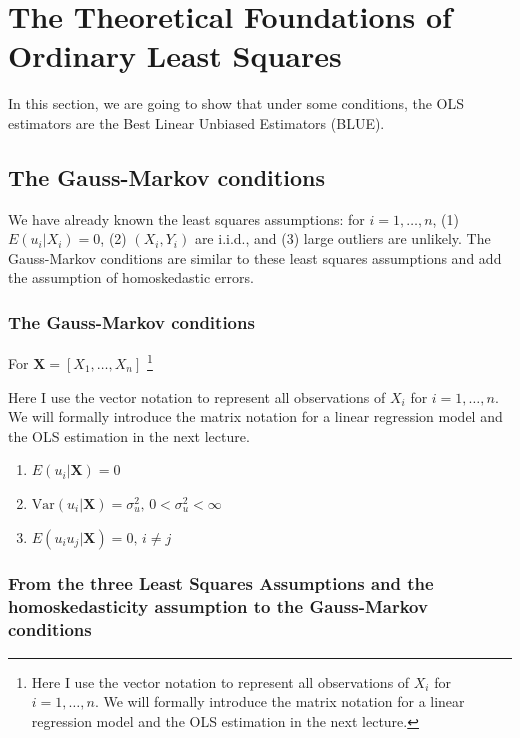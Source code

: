 \documentclass[a4paper,11pt]{article}
\newcommand{\var}{\mathrm{Var}}
\begin{document}
\section{The Theoretical Foundations of Ordinary Least Squares}
\label{sec:org07431ad}

In this section, we are going to show that under some conditions, the
OLS estimators are the Best Linear Unbiased Estimators (BLUE).

\subsection{The Gauss-Markov conditions}
\label{sec:org4949289}

We have already known the least squares assumptions: for \(i = 1,
\ldots, n\), (1) \(E(u_i|X_i) = 0\), (2) \((X_i, Y_i)\) are i.i.d., and (3)
large outliers are unlikely. The Gauss-Markov conditions are similar
to these least squares assumptions and add the assumption of
homoskedastic errors.

\subsubsection*{The Gauss-Markov conditions}
\label{sec:org2a74999}
For \(\mathbf{X} = [X_1, \ldots, X_n]\) \footnote{Here I use the vector
notation to represent all observations of \(X_i\) for \(i=1, \ldots,
n\). We will formally introduce the matrix notation for a linear
regression model and the OLS estimation in the next lecture.}

Here I use the vector
notation to represent all observations of \(X_i\) for \(i=1, \ldots,
n\). We will formally introduce the matrix notation for a linear
regression model and the OLS estimation in the next lecture.

\begin{enumerate}
\item \(E(u_i| \mathbf{X}) = 0\)
\item \(\var(u_i | \mathbf{X}) = \sigma^2_u,\, 0 < \sigma^2_u < \infty\)
\item \(E(u_i u_j | \mathbf{X}) = 0,\, i \neq j\)
\end{enumerate}

\subsubsection*{From the three Least Squares Assumptions and the homoskedasticity assumption to the Gauss-Markov conditions}
\label{sec:org6ffb0b1}
\end{document}
